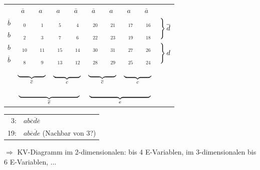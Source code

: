 \documentclass[10pt,a4paper]{scrartcl}
\begin{document}
\begin{tabular}{c|c|c|c|c|c|c|c|c|l}
	& $ \overline{a} $ & $ a $ & $ a $ & $ \overline{a} $ & $ \overline{a} $ & $ a $ & $ a $ & $ \overline{a} $ & \\ \cline{1-9}
	$ \overline{b} $ & $ \phantom{a}_0 $ & $ \phantom{a}_1 $ & $ \phantom{a}_5 $ & $ \phantom{a}_4 $ & $ \phantom{a}_{20} $ & $ \phantom{a}_{21} $ & $ \phantom{a}_{17} $ & $ \phantom{a}_{16} $ & \multirow{2}{*}{$\begin{rcases*} \\ \\ \end{rcases*} \overline{d}$}\\ \cline{1-9}
	$ b $ & $ \phantom{a}_2 $ & $ \phantom{a}_3 $ & $ \phantom{a}_7 $ & $ \phantom{a}_6 $ & $ \phantom{a}_{22} $ & $ \phantom{a}_{23} $ & $ \phantom{a}_{19} $ & $ \phantom{a}_{18} $ \\ \cline{1-9}
	$ b $ & $ \phantom{a}_{10} $ & $ \phantom{a}_{11} $ & $ \phantom{a}_{15} $ & $ \phantom{a}_{14} $ &  $ \phantom{a}_{30} $ & $ \phantom{a}_{31} $ & $ \phantom{a}_{27} $ & $ \phantom{a}_{26} $ & \multirow{2}{*}{$ \begin{rcases*} \\ \\ \end{rcases*} d $}\\ \cline{1-9}
	$ \overline{b} $ & $ \phantom{a}_{8} $ & $ \phantom{a}_{9} $ & $ \phantom{a}_{13} $ & $ \phantom{a}_{12} $ & $ \phantom{a}_{28} $ & $ \phantom{a}_{29} $ & $ \phantom{a}_{25} $ & $ \phantom{a}_{24} $ & \\ \cline{1-9}
	\multicolumn{1}{c}{}& \multicolumn{2}{c}{$ \underbrace{\hspace*{\dimexpr4\tabcolsep+1\arrayrulewidth}\hphantom{012}}_{\overline{c}} $}& \multicolumn{2}{c}{$ \underbrace{\hspace*{\dimexpr4\tabcolsep+1\arrayrulewidth}\hphantom{012}}_{c} $}& \multicolumn{2}{c}{$ \underbrace{\hspace*{\dimexpr4\tabcolsep+1\arrayrulewidth}\hphantom{012}}_{\overline{c}} $}& \multicolumn{2}{c}{$ \underbrace{\hspace*{\dimexpr4\tabcolsep+1\arrayrulewidth}\hphantom{012}}_{c} $} & \\
	\multicolumn{1}{c}{}& \multicolumn{4}{c}{$ \underbrace{\hspace*{\dimexpr12\tabcolsep+1\arrayrulewidth}\hphantom{012}}_{\overline{e}} $}& \multicolumn{4}{c}{$ \underbrace{\hspace*{\dimexpr12\tabcolsep+1\arrayrulewidth}\hphantom{012}}_{e} $}&
\end{tabular}
\begin{tabular}{rl}
	3: & $ ab\overline{c}\overline{d}\overline{e} $\\
	19: & $ ab\overline{c}\overline{d}e $ (Nachbar von 3?)\\
\end{tabular}
$\Rightarrow$ KV-Diagramm im 2-dimensionalen: bis 4 E-Variablen, im 3-dimensionalen bis 6 E-Variablen,  ...
\end{document}
